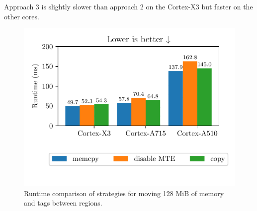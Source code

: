 \noindent
Approach 3 is slightly slower than approach 2 on the Cortex-X3 but faster on the other cores.

\begin{figure}[h]
    \centering
    \includegraphics{plots/migrate}
    \caption{Runtime comparison of strategies for moving 128 MiB of memory and tags between regions.}
    \label{fig:migrate-performance}
\end{figure}
